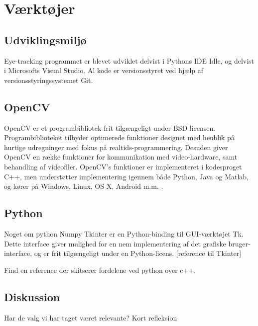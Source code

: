 \documentclass[rapport.tex]{subfiles}
\begin{document}
\section{Værktøjer}
	\subsection{Udviklingsmiljø}
	Eye-tracking programmet er blevet udviklet delvist i Pythons IDE Idle, og delvist i Microsofts Visual Studio. Al kode er versionsstyret ved hjælp af versionsstyringssystemet Git.
	\subsection{OpenCV}
	OpenCV er et programbibliotek frit tilgængeligt under BSD licensen. Programbiblioteket tilbyder optimerede funktioner designet med henblik på hurtige udregninger med fokus på realtids-programmering. Desuden giver OpenCV en række funktioner for kommunikation med video-hardware, samt behandling af videofiler. OpenCV's funktioner er implementeret i kodesproget C++, men understøtter implementering igennem både Python, Java og Matlab, og kører på Windows, Linux, OS X, Android m.m. \cite{opencv}.
	\subsection{Python}
	Noget om python
	Numpy
	Tkinter er en Python-binding til GUI-værktøjet Tk. Dette interface giver mulighed for en nem implementering af det grafiske bruger-interface, og er frit tilgængeligt under en Python-licens. [reference til Tkinter]
	
	Find en reference der skitserer fordelene ved python over c++.
	\subsection{Diskussion}
	Har de valg vi har taget været relevante? Kort refleksion
	
		
\end{document}
